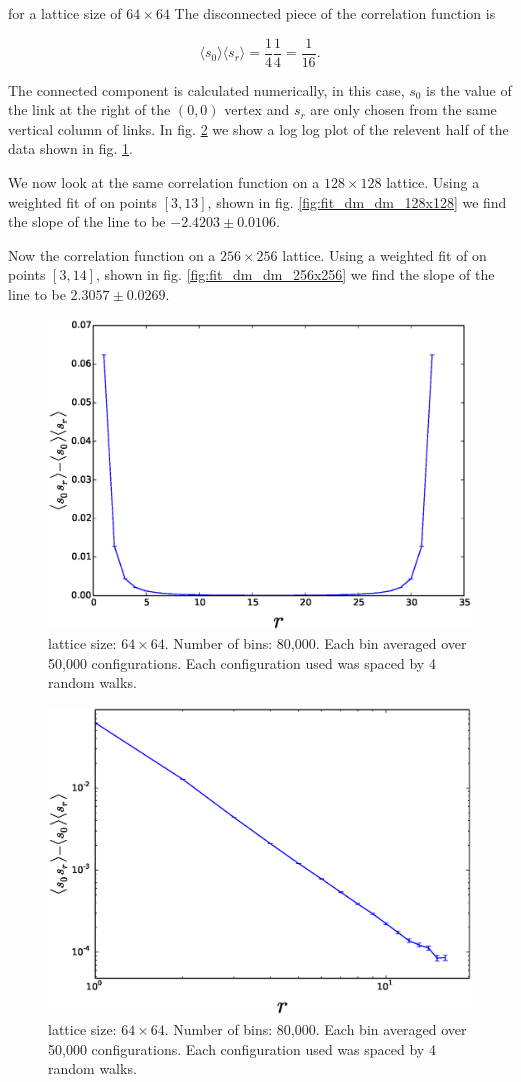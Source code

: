 \documentclass[aps,floatfix,11pt]{revtex4-1}
\begin{document}
\noindent
for a lattice size of $64\times 64$ The disconnected piece of the correlation function is

\begin{equation}
    \label{}
    \langle s_0 \rangle \langle s_r \rangle = \frac{1}{4}\frac{1}{4} = \frac{1}{16}.
\end{equation}

\noindent
The connected component is calculated numerically, in this case, $s_0$ is the value of the link at the
right of the $(0,0)$ vertex and $s_r$ are only chosen from the same vertical column of links.
In fig. \ref{fig:dimer_dimer_cor_log} we show a log log plot of the relevent half of the data
shown in fig. \ref{fig:dimer_dimer_cor}. 

We now look at the same correlation function on a $128\times128$ lattice.
Using a weighted fit of on points $[3,13]$, shown in fig.
\ref{fig:fit_dm_dm_128x128} we find the slope of the line to be $-2.4203\pm 0.0106$.

Now the correlation function on a $256\times256$ lattice.
Using a weighted fit of on points $[3,14]$, shown in fig.
\ref{fig:fit_dm_dm_256x256} we find the slope of the line to be $2.3057\pm 0.0269$.


\begin{figure}[h]
    \centering
    \includegraphics[width=8.5 cm]{dimer_dimer_cor}
    \caption{lattice size: $64\times64$. Number of bins: 80,000. Each bin averaged over 50,000
    configurations. Each configuration used was spaced by 4 random walks.\label{fig:dimer_dimer_cor}}
\end{figure}

\begin{figure}[h]
    \centering
    \includegraphics[width=8.5 cm]{dimer_dimer_cor_log}
    \caption{lattice size: $64\times64$. Number of bins: 80,000. Each bin averaged over 50,000
    configurations. Each configuration used was spaced by 4 random walks.\label{fig:dimer_dimer_cor_log}}
\end{figure}
\end{document}
